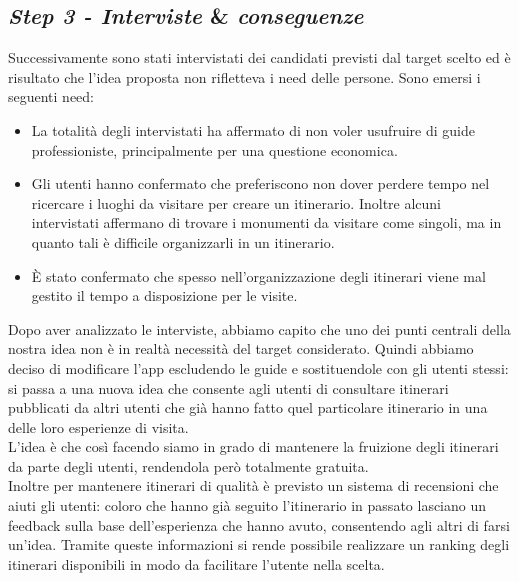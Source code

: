 \subsection{\emph{Step 3 - Interviste} \& \emph{conseguenze}}
Successivamente sono stati intervistati dei candidati previsti dal target scelto ed è risultato che l'idea proposta non rifletteva i need delle persone. Sono emersi i seguenti need:
\begin{itemize}
	\item La totalità degli intervistati ha affermato di non voler usufruire di guide professioniste, principalmente per una questione economica.
	\item Gli utenti hanno confermato che preferiscono non dover perdere tempo nel ricercare i luoghi da visitare per creare un itinerario. Inoltre alcuni intervistati affermano di trovare i monumenti da visitare come singoli, ma in quanto tali è difficile organizzarli in un itinerario.
	\item È stato confermato che spesso nell'organizzazione degli itinerari viene mal gestito il tempo a disposizione per le visite.
\end{itemize}
Dopo aver analizzato le interviste, abbiamo capito che uno dei punti centrali della nostra idea non è in realtà necessità del target considerato. Quindi abbiamo deciso di modificare l'app escludendo le guide e sostituendole con gli utenti stessi: si passa a una nuova idea che consente agli utenti di consultare itinerari  pubblicati da altri utenti che già hanno fatto quel particolare itinerario in una delle loro esperienze di visita. \\
L'idea è che così facendo siamo in grado di mantenere la fruizione degli itinerari da parte degli utenti, rendendola però totalmente gratuita. \\
Inoltre per mantenere itinerari di qualità è previsto un sistema di recensioni che aiuti gli utenti: coloro che hanno già seguito l'itinerario in passato lasciano un feedback sulla base dell'esperienza che hanno avuto, consentendo agli altri di farsi un'idea. Tramite queste informazioni si rende possibile realizzare un ranking degli itinerari disponibili in modo da facilitare l'utente nella scelta.\\



